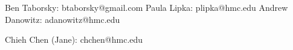 Ben Taborsky:    btaborsky@gmail.com
Paula Lipka:     plipka@hmc.edu
Andrew Danowitz: adanowitz@hmc.edu

Chieh Chen (Jane): chchen@hmc.edu
